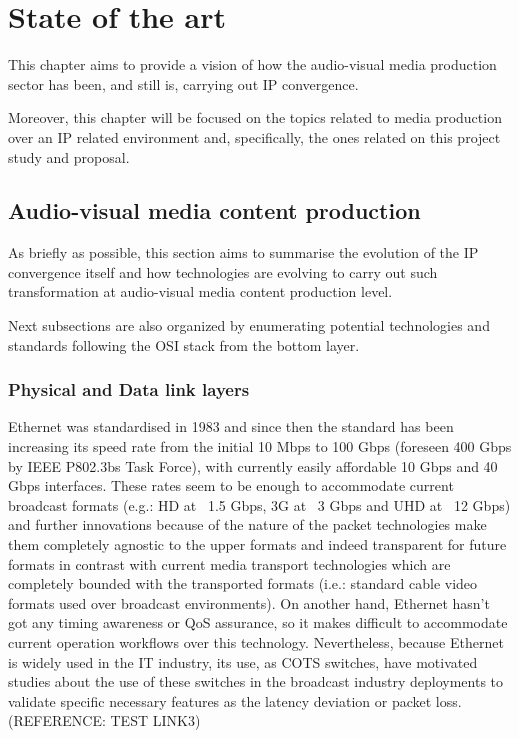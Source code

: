 \chapter{State of the art}\label{A:stateOfTheArt}

This chapter aims to provide a vision of how the audio-visual media production sector has been, and still is, carrying out IP convergence. 

Moreover, this chapter will be focused on the topics related to media production over an IP related environment and, specifically, the ones related on this project study and proposal.

\section{Audio-visual media content production}

As briefly as possible, this section aims to summarise the evolution of the IP convergence itself and how technologies are evolving to carry out such transformation at audio-visual media content production level.

Next subsections are also organized by enumerating potential technologies and standards following the OSI stack from the bottom layer.

\subsection{Physical and Data link layers}

Ethernet was standardised in 1983 and since then the standard has been increasing its speed rate from the initial 10 Mbps to 100 Gbps (foreseen 400 Gbps by IEEE P802.3bs Task Force), with currently easily affordable 10 Gbps and 40 Gbps interfaces. These rates seem to be enough to accommodate current broadcast formats (e.g.: HD at ~1.5 Gbps, 3G at ~3 Gbps and UHD at ~12 Gbps) and further innovations because of the nature of the packet technologies make them completely agnostic to the upper formats and indeed transparent for future formats in contrast with current media transport technologies which are completely bounded with the transported formats (i.e.: standard cable video formats used over broadcast environments). On another hand, Ethernet hasn't got any timing awareness or QoS assurance, so it makes difficult to accommodate current operation workflows over this technology. Nevertheless, because Ethernet is widely used in the IT industry, its use, as COTS switches, have motivated studies about the use of these switches in the broadcast industry deployments to validate specific necessary features as the latency deviation or packet loss. (REFERENCE: TEST LINK3)

